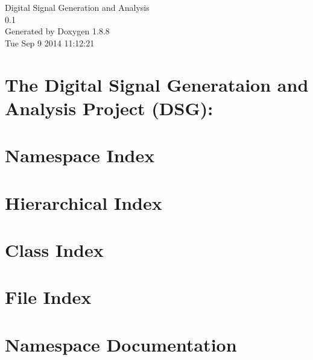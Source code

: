 \documentclass[twoside]{book}
\newcommand{\+}{\discretionary{\mbox{\scriptsize$\hookleftarrow$}}{}{}}
\newcommand{\clearemptydoublepage}{%
  \newpage{\pagestyle{empty}\cleardoublepage}%
}
\begin{document}
\hypersetup{pageanchor=false,
             bookmarks=true,
             bookmarksnumbered=true,
             pdfencoding=unicode
            }
\begin{titlepage}
\vspace*{7cm}
\begin{center}%
{\Large Digital Signal Generation and Analysis \\[1ex]\large 0.\+1 }\\
\vspace*{1cm}
{\large Generated by Doxygen 1.8.8}\\
\vspace*{0.5cm}
{\small Tue Sep 9 2014 11:12:21}\\
\end{center}
\end{titlepage}
\clearemptydoublepage
\tableofcontents
\clearemptydoublepage
{}
\hypersetup{pageanchor=true}

\chapter{The Digital Signal Generataion and Analysis Project (D\+S\+G)\+:}
\label{index}\hypertarget{index}{}
\chapter{Namespace Index}

\chapter{Hierarchical Index}

\chapter{Class Index}

\chapter{File Index}

\chapter{Namespace Documentation}









\end{document}
